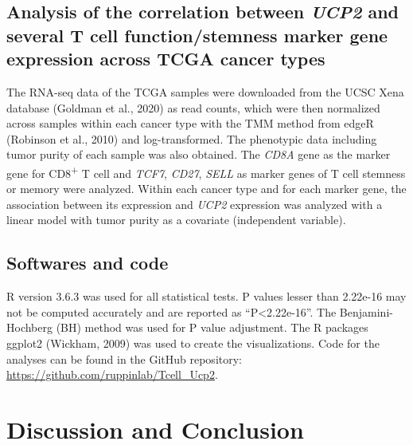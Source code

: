\documentclass[12pt,twoside,openany,\mydriver]{thesis}  %
\begin{document}
\hypertarget{analysis-of-the-correlation-between-ucp2-and-several-t-cell-functionstemness-marker-gene-expression-across-tcga-cancer-types}{%
\subsection{\texorpdfstring{Analysis of the correlation between \emph{UCP2} and several T cell function/stemness marker gene expression across TCGA cancer types}{Analysis of the correlation between UCP2 and several T cell function/stemness marker gene expression across TCGA cancer types}}\label{analysis-of-the-correlation-between-ucp2-and-several-t-cell-functionstemness-marker-gene-expression-across-tcga-cancer-types}}

The RNA-seq data of the TCGA samples were downloaded from the UCSC Xena database (Goldman et al., 2020) as read counts, which were then normalized across samples within each cancer type with the TMM method from edgeR (Robinson et al., 2010) and log-transformed. The phenotypic data including tumor purity of each sample was also obtained. The \emph{CD8A} gene as the marker gene for CD8\textsuperscript{+} T cell and \emph{TCF7}, \emph{CD27}, \emph{SELL} as marker genes of T cell stemness or memory were analyzed. Within each cancer type and for each marker gene, the association between its expression and \emph{UCP2} expression was analyzed with a linear model with tumor purity as a covariate (independent variable).

\hypertarget{softwares-and-code-1}{%
\subsection{Softwares and code}\label{softwares-and-code-1}}

R version 3.6.3 was used for all statistical tests. P values lesser than 2.22e-16 may not be computed accurately and are reported as ``P\textless{}2.22e-16''. The Benjamini-Hochberg (BH) method was used for P value adjustment. The R packages ggplot2 (Wickham, 2009) was used to create the visualizations. Code for the analyses can be found in the GitHub repository: \url{https://github.com/ruppinlab/Tcell_Ucp2}.

\hypertarget{discussion-and-conclusion-1}{%
\section{Discussion and Conclusion}\label{discussion-and-conclusion-1}}
\end{document}
